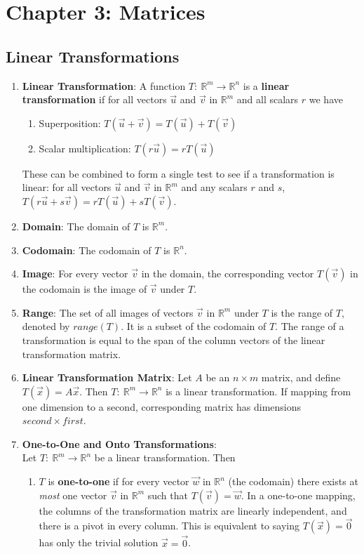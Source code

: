 \documentclass[10pt]{article}
\begin{document}
\section{Chapter 3: Matrices}
\subsection{Linear Transformations}
\begin{enumerate}
\item \textbf{Linear Transformation}: A function $T:\ \mathbb{R}^m \rightarrow \mathbb{R}^n$ is a \textbf{linear transformation} if for all vectors $\vec{u}$ and $\vec{v}$ in $\mathbb{R}^m$ and all scalars $r$ we have
\begin{enumerate}
\item Superposition: $T(\vec{u} + \vec{v}) = T(\vec{u}) + T(\vec{v})$
\item Scalar multiplication: $T(r\vec{u}) = rT(\vec{u})$
\end{enumerate}
These can be combined to form a single test to see if a transformation is linear: for all vectors $\vec{u}$ and $\vec{v}$ in $\mathbb{R}^m$ and any scalars $r$ and $s$, $T(r\vec{u} + s\vec{v}) = rT(\vec{u}) + sT(\vec{v})$.
\item \textbf{Domain}: The domain of $T$ is $\mathbb{R}^m$.
\item \textbf{Codomain}: The codomain of $T$ is $\mathbb{R}^n$.
\item \textbf{Image}: For every vector $\vec{v}$ in the domain, the corresponding vector $T(\vec{v})$ in the codomain is the image of $\vec{v}$ under $T$.
\item \textbf{Range}: The set of all images of vectors $\vec{v}$ in $\mathbb{R}^m$ under $T$ is the range of $T$, denoted by $range(T)$. It is a subset of the codomain of $T$. The range of a transformation is equal to the span of the column vectors of the linear transformation matrix. 
\item \textbf{Linear Transformation Matrix}: Let $A$ be an $n \times m$ matrix, and define $T(\vec{x}) = A\vec{x}$. Then $T:\ \mathbb{R}^m \rightarrow \mathbb{R}^n$ is a linear transformation. If mapping from one dimension to a second, corresponding matrix has dimensions $second \times first$.
\item \textbf{One-to-One and Onto Transformations}: \\
Let $T:\ \mathbb{R}^m \rightarrow \mathbb{R}^n$ be a linear transformation. Then
\begin{enumerate}
\item $T$ is \textbf{one-to-one} if for every vector $\vec{w}$ in $\mathbb{R}^n$ (the codomain) there exists at \textit{most} one vector $\vec{v}$ in $\mathbb{R}^m$ such that $T(\vec{v}) = \vec{w}$. In a one-to-one mapping, the columns of the transformation matrix are linearly independent, and there is a pivot in every column. This is equivalent to saying $T(\vec{x}) = \vec{0}$ has only the trivial solution $\vec{x} = \vec{0}$.

\end{enumerate}
\end{enumerate}
\end{document}
